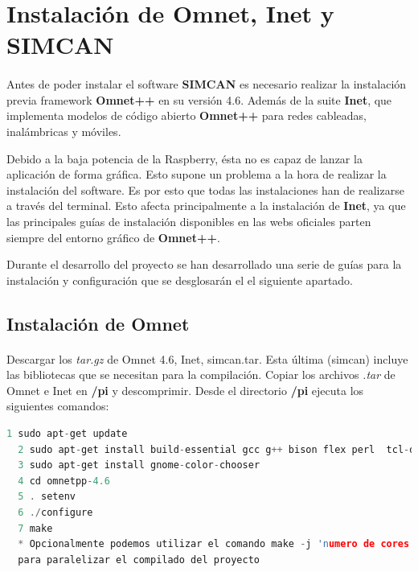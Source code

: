 \section{Instalación de Omnet, Inet y SIMCAN}
\label{makereference3.6}
\paragraph{}
Antes de poder instalar el software \textbf{SIMCAN} es necesario realizar la instalación previa framework \textbf{Omnet++} en su versión 4.6. Además de la suite \textbf{Inet}, que implementa modelos de código abierto \textbf{Omnet++} para redes cableadas, inalámbricas y móviles.

Debido a la baja potencia de la Raspberry, ésta no es capaz de lanzar la aplicación de forma gráfica. Esto supone un problema a la hora de realizar la instalación del software. Es por esto que todas las instalaciones han de realizarse a través del terminal. Esto afecta principalmente a la instalación de \textbf{Inet}, ya que las principales guías de instalación disponibles en las webs oficiales parten siempre del entorno gráfico de \textbf{Omnet++}.

Durante el desarrollo del proyecto se han desarrollado una serie de guías para la instalación y configuración que se desglosarán el el siguiente apartado.

\subsection{Instalación de Omnet}
\paragraph{}

Descargar los \textit{tar.gz}  de Omnet 4.6, Inet, simcan.tar.
Esta última (simcan) incluye las bibliotecas que se necesitan para la compilación.
Copiar los archivos \textit{.tar} de Omnet e Inet en \textbf{/pi} y descomprimir. Desde el directorio \textbf{/pi} ejecuta los siguientes comandos:

\begin{lstlisting}[language=c,frame=single,numbers=none]
  1	sudo apt-get update
  2	sudo apt-get install build-essential gcc g++ bison flex perl  tcl-dev tk-dev libxml2-dev zlib1g-dev default-jre doxygen graphviz libwebkitgtk-1.0-0 openmpi-bin libopenmpi-dev libpcap-dev
  3	sudo apt-get install gnome-color-chooser
  4	cd omnetpp-4.6
  5	. setenv
  6	./configure
  7	make
  * Opcionalmente podemos utilizar el comando make -j 'numero de cores'
  para paralelizar el compilado del proyecto
\end{lstlisting}

